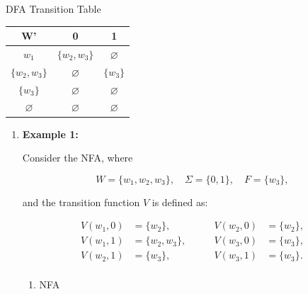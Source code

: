 \documentclass[12pt,a4paper,openany]{article}
\begin{document}
\begin{enumerate}
DFA Transition Table

\begin{center}
\begin{tabular}{c|cc}
\textbf{W'} & \textbf{0} & \textbf{1} \\
\hline
$w_1$ & $\{w_2,w_3\}$ & $\varnothing$ \\
$\{w_2,w_3\}$ & $\varnothing$ & $\{w_3\}$ \\
$\{w_3\}$ & $\varnothing$ & $\varnothing$ \\
$\varnothing$ & $\varnothing$ & $\varnothing$ \\
\end{tabular}
\end{center}

\end{enumerate}


\begin{enumerate}

\item \textbf{Example 1:}

Consider the NFA, where

\[
W = \{w_1, w_2, w_3\}, \quad 
\Sigma = \{0,1\}, \quad
F = \{w_3\},
\]

and the transition function \(V\) is defined as:

\[
\begin{aligned}
V(w_1,0) &= \{w_2\},      &\qquad V(w_2,0) &= \{w_2\}, \\
V(w_1,1) &= \{w_2,w_3\}, &\qquad V(w_3,0) &= \{w_3\}, \\
V(w_2,1) &= \{w_3\},     &\qquad V(w_3,1) &= \{w_3\}. \\
\end{aligned}
\]

\begin{enumerate}

\item NFA

\begin{center}
\end{center}


\end{enumerate}
\end{enumerate}
\end{document}
